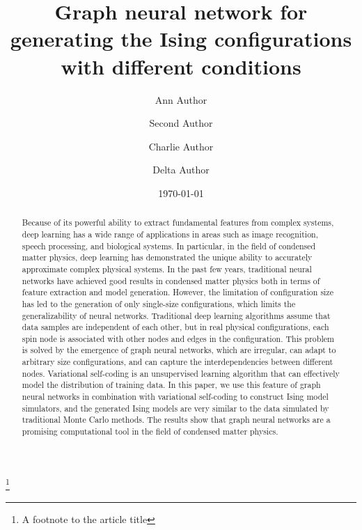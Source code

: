 \documentclass[%
reprint,
amsmath,amssymb,
aps,
]{revtex4-2}
\begin{document}
	

	\title{Graph  neural network for generating the Ising  configurations with different conditions}%
	\thanks{A footnote to the article title}%

	\author{Ann Author}
	\author{Second Author}%


	\author{Charlie Author}
	\author{Delta Author}


	\date{\today}%

	
	\begin{abstract}
		Because of its powerful ability to extract fundamental features from complex systems, deep learning has a wide range of applications in areas such as image recognition, speech processing, and biological systems. In particular, in the field of condensed matter physics, deep learning has demonstrated the unique ability to accurately approximate complex physical systems. In the past few years, traditional neural networks have achieved good results in condensed matter physics both in terms of feature extraction and model generation. However, the limitation of configuration size has led to the generation of only single-size configurations, which limits the generalizability of neural networks. Traditional deep learning algorithms assume that data samples are independent of each other, but in real physical configurations, each spin node is associated with other nodes and edges in the configuration. This problem is solved by the emergence of graph neural networks, which are irregular, can adapt to arbitrary size configurations, and can capture the interdependencies between different nodes. Variational self-coding is an unsupervised learning algorithm that can effectively model the distribution of training data. In this paper, we use this feature of graph neural networks in combination with variational self-coding to construct Ising model simulators, and the generated Ising models are very similar to the data simulated by traditional Monte Carlo methods. The results show that graph neural networks are a promising computational tool in the field of condensed matter physics.
	\end{abstract}
	
\end{document}
